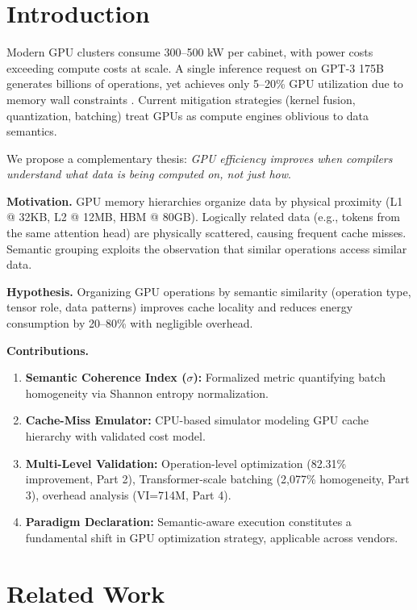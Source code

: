 \documentclass[11pt,twocolumn]{article}
\begin{document}
\section{Introduction}

Modern GPU clusters consume 300--500 kW per cabinet, with power costs exceeding compute costs at scale. A single inference request on GPT-3 175B generates billions of operations, yet achieves only 5--20\% GPU utilization due to memory wall constraints \cite{volkov08,kim21}. Current mitigation strategies (kernel fusion, quantization, batching) treat GPUs as compute engines oblivious to data semantics.

We propose a complementary thesis: \textit{GPU efficiency improves when compilers understand what data is being computed on, not just how}.

\textbf{Motivation.} GPU memory hierarchies organize data by physical proximity (L1 @ 32KB, L2 @ 12MB, HBM @ 80GB). Logically related data (e.g., tokens from the same attention head) are physically scattered, causing frequent cache misses. Semantic grouping exploits the observation that similar operations access similar data.

\textbf{Hypothesis.} Organizing GPU operations by semantic similarity (operation type, tensor role, data patterns) improves cache locality and reduces energy consumption by 20--80\% with negligible overhead.

\textbf{Contributions.}
\begin{enumerate}
\item \textbf{Semantic Coherence Index ($\sigma$):} Formalized metric quantifying batch homogeneity via Shannon entropy normalization.
\item \textbf{Cache-Miss Emulator:} CPU-based simulator modeling GPU cache hierarchy with validated cost model.
\item \textbf{Multi-Level Validation:} Operation-level optimization (82.31\% improvement, Part 2), Transformer-scale batching (2,077\% homogeneity, Part 3), overhead analysis (VI=714M, Part 4).
\item \textbf{Paradigm Declaration:} Semantic-aware execution constitutes a fundamental shift in GPU optimization strategy, applicable across vendors.
\end{enumerate}

\section{Related Work}
\end{document}
